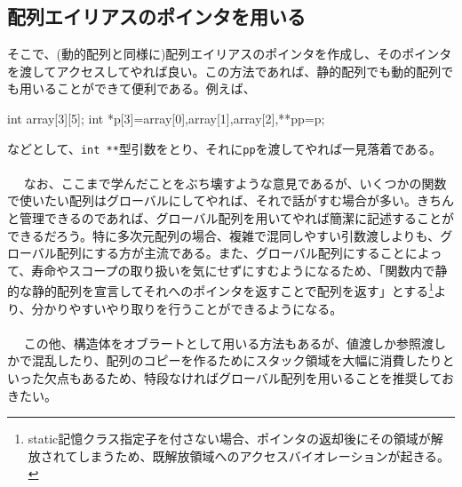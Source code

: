 \subsection{配列エイリアスのポインタを用いる}
そこで、(動的配列と同様に)配列エイリアスのポインタを作成し、そのポインタを渡してアクセスしてやれば良い。この方法であれば、静的配列でも動的配列でも用いることができて便利である。例えば、
\begin{code}
int array[3][5];
int *p[3]={array[0],array[1],array[2]},**pp=p;
\end{code}
などとして、\verb|int **|型引数をとり、それに\verb|pp|を渡してやれば一見落着である。
\\ \\　
なお、ここまで学んだことをぶち壊すような意見であるが、いくつかの関数で使いたい配列はグローバルにしてやれば、それで話がすむ場合が多い。きちんと管理できるのであれば、グローバル配列を用いてやれば簡潔に記述することができるだろう。特に多次元配列の場合、複雑で混同しやすい引数渡しよりも、グローバル配列にする方が主流である。また、グローバル配列にすることによって、寿命やスコープの取り扱いを気にせずにすむようになるため、「関数内で静的な静的配列を宣言してそれへのポインタを返すことで配列を返す」とする\footnote{static記憶クラス指定子を付さない場合、ポインタの返却後にその領域が解放されてしまうため、既解放領域へのアクセスバイオレーションが起きる。}より、分かりやすいやり取りを行うことができるようになる。
\\ \\　
この他、構造体をオブラートとして用いる方法もあるが、値渡しか参照渡しかで混乱したり、配列のコピーを作るためにスタック領域を大幅に消費したりといった欠点もあるため、特段なければグローバル配列を用いることを推奨しておきたい。

\newpage


